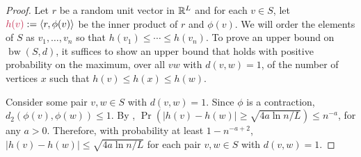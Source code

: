 \documentclass{patmorin}
\makeatletter
\def\mathcolor#1#{\@mathcolor{#1}}
\def\@mathcolor#1#2#3{%
  \protect\leavevmode
  \begingroup
    \color#1{#2}#3%
  \endgroup
}
\newcommand{\mathdefin}[1]{\mathcolor{brightmaroon}{#1}}
\DeclareMathOperator{\bw}{bw}
\makeatother
\begin{document}
\begin{proof}
  Let $r$ be a random unit vector in $\mathbb{R}^L$ and for each $v\in S$, let $\mathdefin{h(v)}:=\langle r,\phi(v)\rangle$ be the inner product of $r$ and $\phi(v)$.  We will order the elements of $S$ as $v_1,\ldots,v_n$ so that $h(v_1)\le \cdots \le h(v_n)$.  To prove an upper bound on $\bw(S,d)$, it suffices to show an upper bound that holds with positive probability on the maximum, over all $vw$ with $d(v,w)=1$, of the number of vertices $x$ such that $h(v)\le h(x)\le h(w)$.

  Consider some pair $v,w\in S$ with $d(v,w)=1$. Since $\phi$ is a contraction, $d_2(\phi(v),\phi(w))\le 1$.  By \cite[Proposition~7]{feige:approximating}, $\Pr(|h(v)-h(w)|\ge \sqrt{4a\ln n/L}) \le n^{-a}$, for any $a>0$. Therefore, with probability at least $1-n^{-a+2}$, $|h(v)-h(w)|\le \sqrt{4a\ln n/L}$ for each pair $v,w\in S$ with $d(v,w)=1$.


\end{proof}
\end{document}
